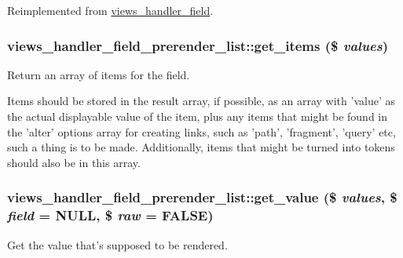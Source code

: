 Reimplemented from \hyperlink{classviews__handler__field_acdeb45612be43c2d58814726b35e55aa}{views\_\-handler\_\-field}.\hypertarget{classviews__handler__field__prerender__list_a69ff2ab99e152c72dc16bdcb4610c2f0}{
\subsubsection[{get\_\-items}]{\setlength{\rightskip}{0pt plus 5cm}views\_\-handler\_\-field\_\-prerender\_\-list::get\_\-items (\$ {\em values})}}
\label{classviews__handler__field__prerender__list_a69ff2ab99e152c72dc16bdcb4610c2f0}
Return an array of items for the field.

Items should be stored in the result array, if possible, as an array with 'value' as the actual displayable value of the item, plus any items that might be found in the 'alter' options array for creating links, such as 'path', 'fragment', 'query' etc, such a thing is to be made. Additionally, items that might be turned into tokens should also be in this array. \hypertarget{classviews__handler__field__prerender__list_a40b68b3c09274438c4910b882acdb6f8}{
\subsubsection[{get\_\-value}]{\setlength{\rightskip}{0pt plus 5cm}views\_\-handler\_\-field\_\-prerender\_\-list::get\_\-value (\$ {\em values}, \/  \$ {\em field} = {\ttfamily NULL}, \/  \$ {\em raw} = {\ttfamily FALSE})}}
\label{classviews__handler__field__prerender__list_a40b68b3c09274438c4910b882acdb6f8}
Get the value that's supposed to be rendered.


